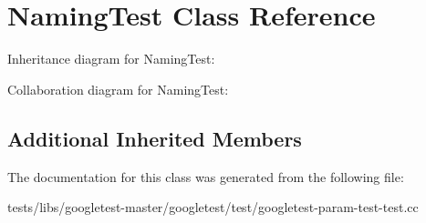 \hypertarget{classNamingTest}{}\section{Naming\+Test Class Reference}
\label{classNamingTest}


Inheritance diagram for Naming\+Test\+:


Collaboration diagram for Naming\+Test\+:
\subsection*{Additional Inherited Members}


The documentation for this class was generated from the following file\+:\begin{DoxyCompactItemize}
\item 
tests/libs/googletest-\/master/googletest/test/googletest-\/param-\/test-\/test.\+cc\end{DoxyCompactItemize}
